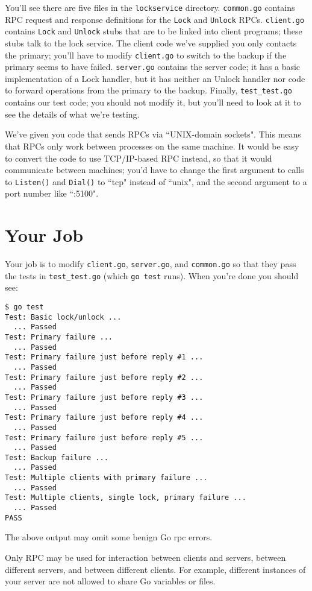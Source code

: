 \documentclass{article}
\newcommand{\code}{\texttt}
\begin{document}
You'll see there are five files in the \code{lockservice} directory. \code{common.go} contains RPC request and response definitions for the \code{Lock} and \code{Unlock} RPCs. \code{client.go} contains \code{Lock} and \code{Unlock} stubs that are to be linked into client programs; these stubs talk to the lock service. The client code we've supplied you only contacts the primary; you'll have to modify \code{client.go} to switch to the backup if the primary seems to have failed. \code{server.go} contains the server code; it has a basic implementation of a Lock handler, but it has neither an Unlock handler nor code to forward operations from the primary to the backup. Finally, \code{test\_test.go} contains our test code; you should not modify it, but you'll need to look at it to see the details of what we're testing.

We've given you code that sends RPCs via ``UNIX-domain sockets". This means that RPCs only work between processes on the same machine. It would be easy to convert the code to use TCP/IP-based RPC instead, so that it would communicate between machines; you'd have to change the first argument to calls to \code{Listen()} and \code{Dial()} to ``tcp" instead of ``unix", and the second argument to a port number like ``:5100".


\section{Your Job}
Your job is to modify \code{client.go}, \code{server.go}, and \code{common.go} so that they pass the tests in \code{test\_test.go} (which \code{go test} runs). When you're done you should see:

\begin{lstlisting}
$ go test
Test: Basic lock/unlock ...
  ... Passed
Test: Primary failure ...
  ... Passed
Test: Primary failure just before reply #1 ...
  ... Passed
Test: Primary failure just before reply #2 ...
  ... Passed
Test: Primary failure just before reply #3 ...
  ... Passed
Test: Primary failure just before reply #4 ...
  ... Passed
Test: Primary failure just before reply #5 ...
  ... Passed
Test: Backup failure ...
  ... Passed
Test: Multiple clients with primary failure ...
  ... Passed
Test: Multiple clients, single lock, primary failure ...
  ... Passed
PASS
\end{lstlisting}
The above output may omit some benign Go rpc errors.

Only RPC may be used for interaction between clients and servers, between different servers, and between different clients. For example, different instances of your server are not allowed to share Go variables or files.
\end{document}
